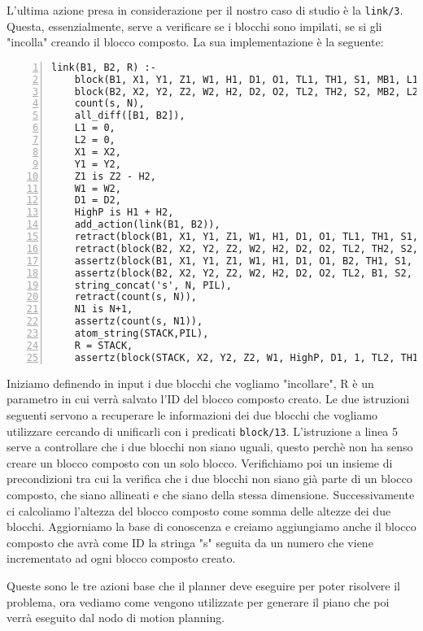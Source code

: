 L'ultima azione presa in considerazione per il nostro caso di studio è la \verb+link/3+. Questa, essenzialmente, serve a verificare se i blocchi sono impilati, se si gli "incolla" creando il blocco composto. La sua implementazione è la seguente:
\begin{lstlisting}[numbers=left]
link(B1, B2, R) :-
    block(B1, X1, Y1, Z1, W1, H1, D1, O1, TL1, TH1, S1, MB1, L1),
    block(B2, X2, Y2, Z2, W2, H2, D2, O2, TL2, TH2, S2, MB2, L2),
    count(s, N),
    all_diff([B1, B2]),
    L1 = 0,
    L2 = 0,
    X1 = X2,
    Y1 = Y2,
    Z1 is Z2 - H2,
    W1 = W2,
    D1 = D2,
    HighP is H1 + H2,
    add_action(link(B1, B2)),
    retract(block(B1, X1, Y1, Z1, W1, H1, D1, O1, TL1, TH1, S1, MB1, L1)),
    retract(block(B2, X2, Y2, Z2, W2, H2, D2, O2, TL2, TH2, S2, MB2, L2)),
    assertz(block(B1, X1, Y1, Z1, W1, H1, D1, O1, B2, TH1, S1, MB1, 1)),
    assertz(block(B2, X2, Y2, Z2, W2, H2, D2, O2, TL2, B1, S2, MB2, 1)),
    string_concat('s', N, PIL),
    retract(count(s, N)),
    N1 is N+1,
    assertz(count(s, N1)),
    atom_string(STACK,PIL),
    R = STACK,
    assertz(block(STACK, X2, Y2, Z2, W1, HighP, D1, 1, TL2, TH1, block, [B1,B2],0)).
\end{lstlisting}
Iniziamo definendo in input i due blocchi che vogliamo "incollare", R è un parametro in cui verrà salvato l'ID del blocco composto creato.
Le due istruzioni seguenti servono a recuperare le informazioni dei due blocchi che vogliamo utilizzare cercando di unificarli con i predicati \verb+block/13+.
L'istruzione a linea 5 serve a controllare che i due blocchi non siano uguali, questo perchè non ha senso creare un blocco composto con un solo blocco. Verifichiamo poi un insieme di precondizioni tra cui la verifica che i due blocchi non siano già parte di un blocco composto, che siano allineati e che siano della stessa dimensione.
Successivamente ci calcoliamo l'altezza del blocco composto come somma delle altezze dei due blocchi. Aggiorniamo la base di conoscenza e creiamo aggiungiamo anche il blocco composto che avrà come ID la stringa "s" seguita da un numero che viene incrementato ad ogni blocco composto creato.

Queste sono le tre azioni base che il planner deve eseguire per poter risolvere il problema, ora vediamo come vengono utilizzate per generare il piano che poi verrà eseguito dal nodo di motion planning.
